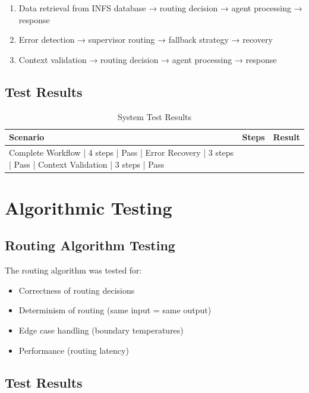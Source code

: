 \begin{enumerate}
    \item Data retrieval from INFS database → routing decision → agent processing → response
    \item Error detection → supervisor routing → fallback strategy → recovery
    \item Context validation → routing decision → agent processing → response
\end{enumerate}

\subsection{Test Results}

\begin{table}[H]
\centering
\begin{tabular}{|l|l|l|}
\hline
\textbf{Scenario} & \textbf{Steps} & \textbf{Result} \\
\hline
Complete Workflow | 4 steps | Pass |
Error Recovery | 3 steps | Pass |
Context Validation | 3 steps | Pass \\
\hline
\end{tabular}
\caption{System Test Results}
\end{table}

\section{Algorithmic Testing}

\subsection{Routing Algorithm Testing}

The routing algorithm was tested for:

\begin{itemize}
    \item Correctness of routing decisions
    \item Determinism of routing (same input = same output)
    \item Edge case handling (boundary temperatures)
    \item Performance (routing latency)
\end{itemize}

\subsection{Test Results}

